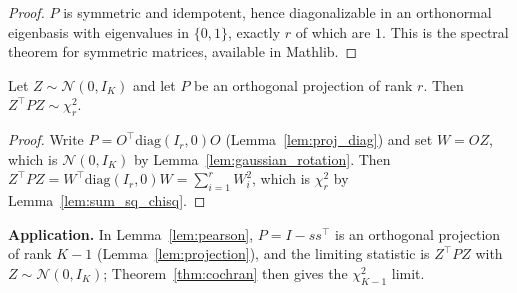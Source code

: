 \begin{proof}
$P$ is symmetric and idempotent, hence diagonalizable in an orthonormal
eigenbasis with eigenvalues in $\{0,1\}$, exactly $r$ of which are $1$. This is
the spectral theorem for symmetric matrices, available in Mathlib.
\end{proof}

\begin{theorem}\label{thm:cochran}
\leanok
{}
Let $Z\sim\mathcal{N}(0,I_K)$ and let $P$ be an orthogonal projection of rank $r$.
Then $Z^\top P Z\sim\chi^2_r$.
\end{theorem}

\begin{proof}
Write $P = O^\top\mathrm{diag}(I_r,0)O$ (Lemma~\ref{lem:proj_diag}) and set
$W = OZ$, which is $\mathcal{N}(0,I_K)$ by Lemma~\ref{lem:gaussian_rotation}.
Then $Z^\top P Z = W^\top\mathrm{diag}(I_r,0)W = \sum_{i=1}^r W_i^2$, which is
$\chi^2_r$ by Lemma~\ref{lem:sum_sq_chisq}.
\end{proof}

\textbf{Application.} In Lemma~\ref{lem:pearson}, $P = I - ss^\top$ is an
orthogonal projection of rank $K-1$ (Lemma~\ref{lem:projection}), and the limiting
statistic is $Z^\top P Z$ with $Z\sim\mathcal{N}(0,I_K)$; Theorem~\ref{thm:cochran}
then gives the $\chi^2_{K-1}$ limit.
